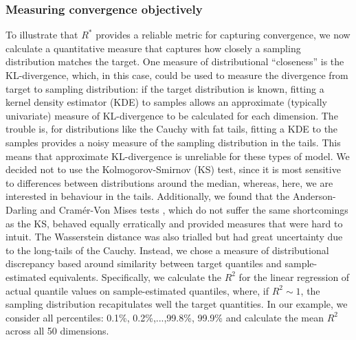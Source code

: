\documentclass[ba]{imsart}
\numberwithin{equation}{section}
\theoremstyle{plain}
\begin{document}
\subsubsection{Measuring convergence objectively}\label{sec:cauchy_objective}
To illustrate that $R^*$ provides a reliable metric for capturing convergence, we now calculate a quantitative measure that captures how closely a sampling distribution matches the target. One measure of distributional ``closeness'' is the KL-divergence, which, in this case, could be used to measure the divergence from target to sampling distribution: if the target distribution is known, fitting a kernel density estimator (KDE) to samples allows an approximate (typically univariate) measure of KL-divergence to be calculated for each dimension. The trouble is, for distributions like the Cauchy with fat tails, fitting a KDE to the samples provides a noisy measure of the sampling distribution in the tails. This means that approximate KL-divergence is unreliable for these types of model. We decided not to use the Kolmogorov-Smirnov (KS) test, since it is most sensitive to differences between distributions around the median, whereas, here, we are interested in behaviour in the tails. Additionally, we found that the Anderson-Darling and Cram\'er-Von Mises tests \citep{faraway2019goftest}, which do not suffer the same shortcomings as the KS, behaved equally erratically and provided measures that were hard to intuit. The Wasserstein distance was also trialled but had great uncertainty due to the long-tails of the Cauchy. Instead, we chose a measure of distributional discrepancy based around similarity between target quantiles and sample-estimated equivalents. Specifically, we calculate the $R^2$ for the linear regression of actual quantile values on sample-estimated quantiles, where, if $R^2\sim 1$, the sampling distribution recapitulates well the target quantities. In our example, we consider all percentiles: 0.1\%, 0.2\%,...,99.8\%, 99.9\% and calculate the mean $R^2$ across all 50 dimensions.
\end{document}
